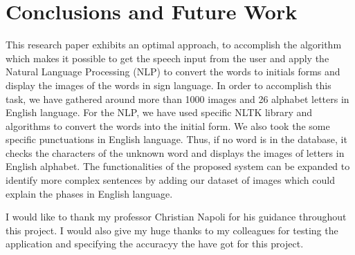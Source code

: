 \documentclass[twocolumn,10pt]{asme2ej}
\begin{document}
\section{Conclusions and Future Work}
This research paper exhibits an optimal approach, to accomplish the algorithm which makes it possible to get the speech input from the user and apply the Natural Language Processing (NLP) to convert the words to initials forms and display the images of the words in sign language. In order to accomplish this task, we have gathered around more than 1000 images and 26 alphabet letters in English language. For the NLP, we have used specific NLTK library and algorithms to convert the words into the initial form. We also took the some specific punctuations in English language. Thus, if no word is in the database, it checks the characters of the unknown word and displays the images of letters in English alphabet.   
The functionalities of the proposed system can be expanded to identify more complex sentences by adding our dataset of images which could explain the phases in English language. 

\begin{acknowledgment}
I would like to thank my professor Christian Napoli for his guidance throughout this project. I would also give my huge thanks to my colleagues for testing the application and specifying the accuracyy the have got for this project. 
\end{acknowledgment}


\end{document}
